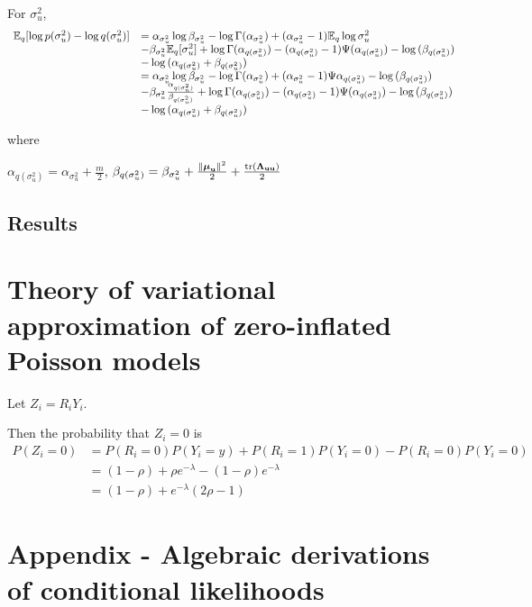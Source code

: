 \documentclass{amsart}
\begin{document}
For $\sigma^2_u$,
$$
\begin{array}{ll}
{\mathbb E}_q[\log{p(\sigma^2_u)} - \log{q(\sigma^2_u)}] &=
\alpha_{\sigma^2_u} \log{\beta_{\sigma^2_u}} - \log{\Gamma{(\alpha_{\sigma^2_u})}} +
(\alpha_{\sigma^2_u} - 1) {\mathbb E}_q	\log{\sigma^2_u}\\
&- \beta_{\sigma^2_u} {\mathbb E}_q [\sigma^2_u] +
\log{\Gamma(\alpha_{q(\sigma^2_u)})} - (\alpha_{q(\sigma^2_u)} - 1) \Psi{(\alpha_{q(\sigma^2_u)})} - \log{(\beta_{q(\sigma^2_u)})}\\
&- \log{(\alpha_{q(\sigma^2_u)} + \beta_{q(\sigma^2_u)})}\\
&=\alpha_{\sigma^2_u} \log{\beta_{\sigma^2_u}} - \log{\Gamma{(\alpha_{\sigma^2_u})}} +
(\alpha_{\sigma^2_u} - 1) \Psi{\alpha_{q(\sigma^2_u)}} - \log{(\beta_{q(\sigma^2_u)})} \\
&- \beta_{\sigma^2_u} \frac{\alpha_{q(\sigma^2_u)}}{\beta_{q(\sigma^2_u)}} + 
\log{\Gamma(\alpha_{q(\sigma^2_u)})} - (\alpha_{q(\sigma^2_u)} - 1) \Psi{(\alpha_{q(\sigma^2_u)})} - \log{(\beta_{q(\sigma^2_u)})}\\
&- \log{(\alpha_{q(\sigma^2_u)} + \beta_{q(\sigma^2_u)})}
\end{array}
$$

where

$\alpha_{q(\sigma^2_u)} = \alpha_{\sigma^2_u} + \frac{m}{2}$,
$\beta_{q(\sigma^2_u)} = \beta_{\sigma^2_u} + \frac{\|{\boldsymbol \mu}_{\bf u}\|^2}{2} + \frac{\text{tr}{({\boldsymbol\Lambda}_{{\bf u}{\bf u}})}}{2}$

\subsection{Results}

\section{Theory of variational approximation of zero-inflated Poisson models}
Let $Z_i = R_i Y_i$.

Then the probability that $Z_i = 0$ is
$$
\begin{array}{ll}
P(Z_i = 0) &= P(R_i = 0)P(Y_i = y) + P(R_i = 1) P(Y_i = 0) - P(R_i = 0) P(Y_i = 0) \\
&= (1 - \rho) + \rho e^{-\lambda} - (1 - \rho) e^{-\lambda} \\
&= (1 - \rho) + e^{-\lambda}(2 \rho - 1)
\end{array}
$$

\section{Appendix - Algebraic derivations of conditional likelihoods}
\end{document}
